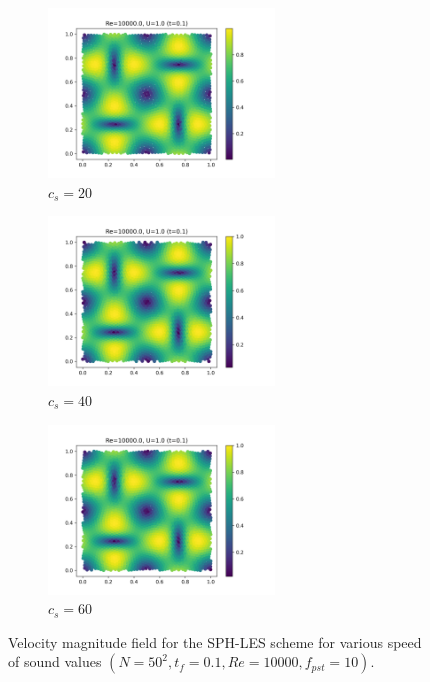 \begin{figure}[htbp!]
  \begin{subfigure}{7cm}
    \centering\includegraphics[width=6cm]{Code-Figures/okra2022/c0/c0_20_tait_pec_dtmul_1_nx_50_pst_10_re_10000_ok2022/final_vmag.png}
    \caption{$c_s=20$}
  \end{subfigure}
  \begin{subfigure}{7cm}
    \centering\includegraphics[width=6cm]{Code-Figures/okra2022/c0/c0_40_tait_pec_dtmul_1_nx_50_pst_10_re_10000_ok2022/final_vmag.png}
    \caption{$c_s=40$}
  \end{subfigure}
  \begin{subfigure}{7cm}
    \centering\includegraphics[width=6cm]{Code-Figures/okra2022/c0/c0_60_tait_pec_dtmul_1_nx_50_pst_10_re_10000_ok2022/final_vmag.png}
    \caption{$c_s=60$}
  \end{subfigure}
  \caption{Velocity magnitude field for the SPH-LES scheme for various speed of sound values $(N=50^2, t_f=0.1, Re=10000, f_{pst}=10)$.}
  \label{fig:okra2022-c0-vmag}
\end{figure}

